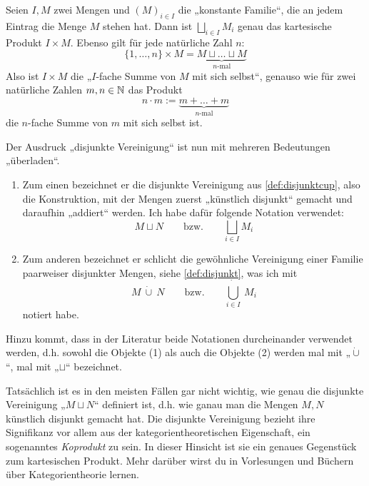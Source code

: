     
\begin{bem}
    Seien $I,M$ zwei Mengen und $(M)_{i\in I}$ die „konstante Familie“, die an jedem Eintrag die Menge $M$ stehen hat. Dann ist $\bigsqcup_{i\in I} M_i$ genau das kartesische Produkt $I\times M$. Ebenso gilt für jede natürliche Zahl $n$:
        \[ \{1,\dots , n\} \times M = \underbrace{M\sqcup\ldots\sqcup M}_{\text{$n$-mal}} \]
    Also ist $I\times M$ die „$I$-fache Summe von $M$ mit sich selbst“, genauso wie für zwei natürliche Zahlen $m,n\in \mathbb N$ das Produkt
        \[ n\cdot m := \underbrace{m +\ldots + m}_{\text{$n$-mal}}\]
    die $n$-fache Summe von $m$ mit sich selbst ist.
\end{bem}


\begin{vorschau}
    Der Ausdruck „disjunkte Vereinigung“ ist nun mit mehreren Bedeutungen „überladen“.
    \begin{enumerate}[(1)]
        \item Zum einen bezeichnet er die disjunkte Vereinigung aus \cref{def:disjunktcup}, also die Konstruktion, mit der Mengen zuerst „künstlich disjunkt“ gemacht und daraufhin „addiert“ werden. Ich habe dafür folgende Notation verwendet:
            \[ M\sqcup N \qquad\text{bzw.}\qquad \bigsqcup_{i\in I} M_i \]
        \item Zum anderen bezeichnet er schlicht die gewöhnliche Vereinigung einer Familie paarweiser disjunkter Mengen, siehe \cref{def:disjunkt}, was ich mit
            \[ M\ \dot\cup\ N \qquad\text{bzw.}\qquad   \dot{\bigcup_{i\in I}}\ M_i \]
        notiert habe.
    \end{enumerate}
    Hinzu kommt, dass in der Literatur beide Notationen durcheinander verwendet werden, d.h. sowohl die Objekte (1) als auch die Objekte (2) werden mal mit „$\dot\cup$“, mal mit „$\sqcup$“ bezeichnet.
    
    Tatsächlich ist es in den meisten Fällen gar nicht wichtig, wie genau die disjunkte Vereinigung „$M \sqcup N$“ definiert ist, d.h. wie ganau man die Mengen $M,N$ künstlich disjunkt gemacht hat. Die disjunkte Vereinigung bezieht ihre Signifikanz vor allem aus der kategorientheoretischen Eigenschaft, ein sogenanntes \emph{Koprodukt} zu sein. In dieser Hinsicht ist sie ein genaues Gegenstück zum kartesischen Produkt. Mehr darüber wirst du in Vorlesungen und Büchern über Kategorientheorie lernen.
\end{vorschau}





